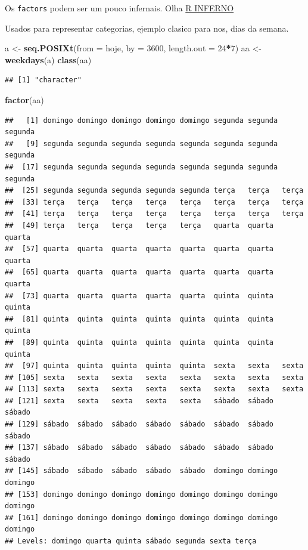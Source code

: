 \documentclass[]{book}
\newenvironment{Shaded}{\begin{snugshade}}{\end{snugshade}}
\newcommand{\KeywordTok}[1]{\textcolor[rgb]{0.13,0.29,0.53}{\textbf{#1}}}
\newcommand{\DataTypeTok}[1]{\textcolor[rgb]{0.13,0.29,0.53}{#1}}
\newcommand{\DecValTok}[1]{\textcolor[rgb]{0.00,0.00,0.81}{#1}}
\newcommand{\StringTok}[1]{\textcolor[rgb]{0.31,0.60,0.02}{#1}}
\newcommand{\OperatorTok}[1]{\textcolor[rgb]{0.81,0.36,0.00}{\textbf{#1}}}
\newcommand{\NormalTok}[1]{#1}
\theoremstyle{definition}
\theoremstyle{definition}
\theoremstyle{definition}
\theoremstyle{remark}
\begin{document}
Os \texttt{factors} podem ser um pouco infernais. Olha
\href{http://www.burns-stat.com/documents/books/the-r-inferno/}{R
INFERNO}

Usados para representar categorias, ejemplo clasico para nos, dias da
semana.

\begin{Shaded}
\begin{Highlighting}[]
\NormalTok{a <-}\StringTok{ }\KeywordTok{seq.POSIXt}\NormalTok{(}\DataTypeTok{from =}\NormalTok{ hoje, }\DataTypeTok{by =} \DecValTok{3600}\NormalTok{, }\DataTypeTok{length.out =} \DecValTok{24}\OperatorTok{*}\DecValTok{7}\NormalTok{)}
\NormalTok{aa <-}\StringTok{ }\KeywordTok{weekdays}\NormalTok{(a)}
\KeywordTok{class}\NormalTok{(aa)}
\end{Highlighting}
\end{Shaded}

\begin{verbatim}
## [1] "character"
\end{verbatim}

\begin{Shaded}
\begin{Highlighting}[]
\KeywordTok{factor}\NormalTok{(aa)}
\end{Highlighting}
\end{Shaded}

\begin{verbatim}
##   [1] domingo domingo domingo domingo domingo segunda segunda segunda
##   [9] segunda segunda segunda segunda segunda segunda segunda segunda
##  [17] segunda segunda segunda segunda segunda segunda segunda segunda
##  [25] segunda segunda segunda segunda segunda terça   terça   terça  
##  [33] terça   terça   terça   terça   terça   terça   terça   terça  
##  [41] terça   terça   terça   terça   terça   terça   terça   terça  
##  [49] terça   terça   terça   terça   terça   quarta  quarta  quarta 
##  [57] quarta  quarta  quarta  quarta  quarta  quarta  quarta  quarta 
##  [65] quarta  quarta  quarta  quarta  quarta  quarta  quarta  quarta 
##  [73] quarta  quarta  quarta  quarta  quarta  quinta  quinta  quinta 
##  [81] quinta  quinta  quinta  quinta  quinta  quinta  quinta  quinta 
##  [89] quinta  quinta  quinta  quinta  quinta  quinta  quinta  quinta 
##  [97] quinta  quinta  quinta  quinta  quinta  sexta   sexta   sexta  
## [105] sexta   sexta   sexta   sexta   sexta   sexta   sexta   sexta  
## [113] sexta   sexta   sexta   sexta   sexta   sexta   sexta   sexta  
## [121] sexta   sexta   sexta   sexta   sexta   sábado  sábado  sábado 
## [129] sábado  sábado  sábado  sábado  sábado  sábado  sábado  sábado 
## [137] sábado  sábado  sábado  sábado  sábado  sábado  sábado  sábado 
## [145] sábado  sábado  sábado  sábado  sábado  domingo domingo domingo
## [153] domingo domingo domingo domingo domingo domingo domingo domingo
## [161] domingo domingo domingo domingo domingo domingo domingo domingo
## Levels: domingo quarta quinta sábado segunda sexta terça
\end{verbatim}
\end{document}
